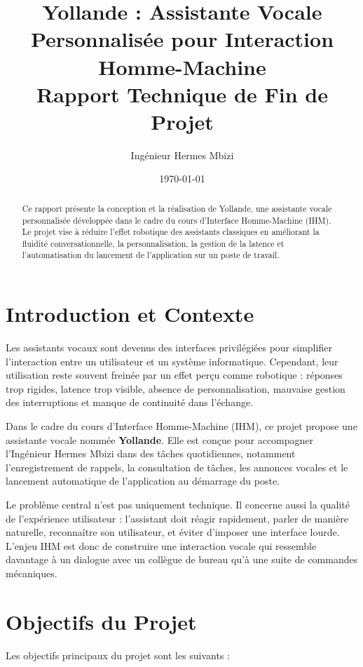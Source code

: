 \documentclass[12pt,a4paper]{report}
\title{
  \textbf{Yollande : Assistante Vocale Personnalisée pour Interaction Homme-Machine}\\
  \large Rapport Technique de Fin de Projet
}
\author{Ingénieur Hermes Mbizi}
\date{\today}
\begin{document}
\maketitle

\begin{abstract}
Ce rapport présente la conception et la réalisation de Yollande, une assistante vocale
personnalisée développée dans le cadre du cours d'Interface Homme-Machine (IHM).
Le projet vise à réduire l'effet robotique des assistants classiques en améliorant la
fluidité conversationnelle, la personnalisation, la gestion de la latence et
l'automatisation du lancement de l'application sur un poste de travail.
\end{abstract}

\tableofcontents
\clearpage

\chapter{Introduction et Contexte}

Les assistants vocaux sont devenus des interfaces privilégiées pour simplifier
l'interaction entre un utilisateur et un système informatique. Cependant, leur
utilisation reste souvent freinée par un effet perçu comme robotique : réponses
trop rigides, latence trop visible, absence de personnalisation, mauvaise gestion
des interruptions et manque de continuité dans l'échange.

Dans le cadre du cours d'Interface Homme-Machine (IHM), ce projet propose une
assistante vocale nommée \textbf{Yollande}. Elle est conçue pour accompagner
l'Ingénieur Hermes Mbizi dans des tâches quotidiennes, notamment l'enregistrement
de rappels, la consultation de tâches, les annonces vocales et le lancement
automatique de l'application au démarrage du poste.

Le problème central n'est pas uniquement technique. Il concerne aussi la qualité
de l'expérience utilisateur : l'assistant doit réagir rapidement, parler de manière
naturelle, reconnaître son utilisateur, et éviter d'imposer une interface lourde.
L'enjeu IHM est donc de construire une interaction vocale qui ressemble davantage
à un dialogue avec un collègue de bureau qu'à une suite de commandes mécaniques.

\chapter{Objectifs du Projet}

Les objectifs principaux du projet sont les suivants :
\end{document}
